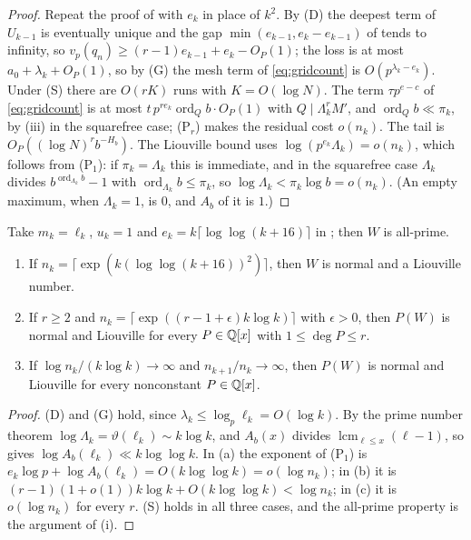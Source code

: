 \documentclass[11pt]{article}
\DeclareMathOperator{\ord}{ord}
\DeclareMathOperator{\lcm}{lcm}
\begin{document}
\begin{proof}
Repeat the proof of  with $e_k$ in place of $k^2$. By (D) the deepest term of $U_{k-1}$ is eventually
unique and the gap $\min(e_{k-1},e_k-e_{k-1})$ of  tends to infinity, so $v_p(q_n)\ge(r-1)e_{k-1}+e_k-O_P(1)$;
the loss is at most $a_0+\lambda_k+O_P(1)$, so by (G) the mesh term of \eqref{eq:gridcount} is $O(p^{\lambda_k-e_k})$. Under (S)
there are $O(rK)$ runs with $K=O(\log N)$. The term $\tau p^{e-c}$ of \eqref{eq:gridcount} is at most
$t\,p^{re_k}\ord_Qb\cdot O_P(1)$ with $Q\mid\Lambda_k^rM'$, and $\ord_Qb\ll\pi_k$, by (iii) in the squarefree
case; (P$_r$) makes the residual cost $o(n_k)$. The tail is $O_P((\log N)^rb^{-H_b})$. The Liouville bound uses
$\log(p^{e_k}\Lambda_k)=o(n_k)$, which follows from (P$_1$): if $\pi_k=\Lambda_k$ this is immediate, and in the squarefree case
$\Lambda_k$ divides $b^{\ord_{\Lambda_k}b}-1$ with $\ord_{\Lambda_k}b\le\pi_k$, so $\log\Lambda_k<\pi_k\log b=o(n_k)$. (An empty maximum,
when $\Lambda_k=1$, is $0$, and $A_b$ of it is $1$.)
\end{proof}

\begin{corollary}\label{cor:dense}
Take $m_k=\ell_k$, $u_k=1$ and $e_k=k\lceil\log\log(k+16)\rceil$ in ; then $W$ is all-prime.
\begin{enumerate}[label=\textup{(\alph*)},nosep]
\item If $n_k=\lceil\exp(k(\log\log(k+16))^2)\rceil$, then $W$ is normal and a Liouville number.
\item If $r\ge2$ and $n_k=\lceil\exp((r-1+\epsilon)k\log k)\rceil$ with $\epsilon>0$, then $P(W)$ is normal and Liouville for every
$P\in\mathbb Q[x]$ with $1\le\deg P\le r$.
\item If $\log n_k/(k\log k)\to\infty$ and $n_{k+1}/n_k\to\infty$, then $P(W)$ is normal and Liouville for every nonconstant
$P\in\mathbb Q[x]$.
\end{enumerate}
\end{corollary}

\begin{proof}
(D) and (G) hold, since $\lambda_k\le\log_p\ell_k=O(\log k)$. By the prime number theorem $\log\Lambda_k=\vartheta(\ell_k)\sim k\log k$, and
$A_b(x)$ divides $\lcm_{\ell\le x}(\ell-1)$, so  gives $\log A_b(\ell_k)\ll k\log\log k$. In (a) the exponent of
(P$_1$) is $e_k\log p+\log A_b(\ell_k)=O(k\log\log k)=o(\log n_k)$; in (b) it is $(r-1)(1+o(1))k\log k+O(k\log\log k)<\log n_k$; in
(c) it is $o(\log n_k)$ for every $r$. (S) holds in all three cases, and the all-prime property is the argument of
(i).
\end{proof}
\end{document}
